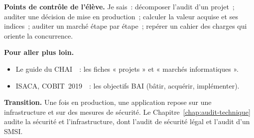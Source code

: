 \bigskip

\begin{boxinfo}
\textbf{Points de contrôle de l'élève.} Je sais~: décomposer l'audit d'un
projet~; auditer une décision de mise en production~; calculer la valeur
acquise et ses indices~; auditer un marché étape par étape~; repérer un
cahier des charges qui oriente la concurrence.
\end{boxinfo}

\begin{boxinfo}
\textbf{Pour aller plus loin.}
\begin{itemize}
    \item Le guide du CHAI~\cite{chai2014guide}~: les fiches « projets » et
          « marchés informatiques ».
    \item ISACA, COBIT~2019~\cite{isaca2018cobitobjectifs}~: les objectifs
          BAI (bâtir, acquérir, implémenter).
\end{itemize}
\end{boxinfo}

\begin{boxinfo}
\textbf{Transition.} Une fois en production, une application repose sur une
infrastructure et sur des mesures de sécurité. Le
Chapitre~\ref{chap:audit-technique} audite la sécurité et l'infrastructure,
dont l'audit de sécurité légal et l'audit d'un SMSI.
\end{boxinfo}
